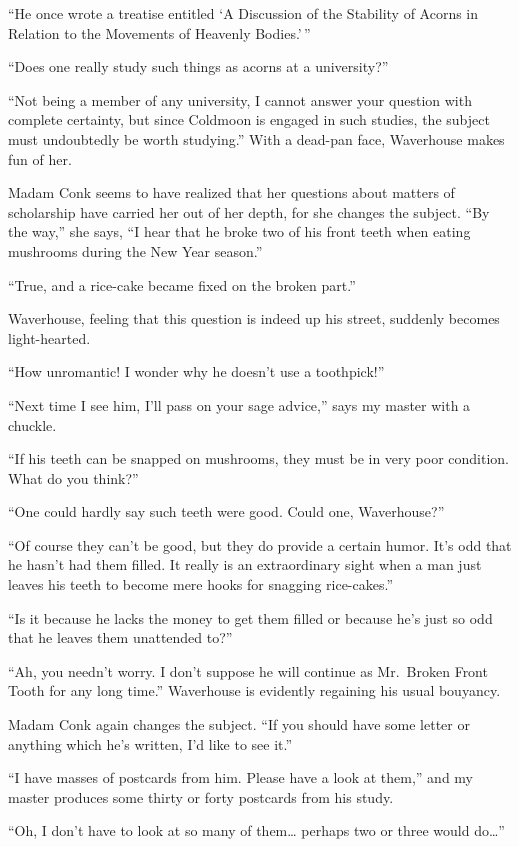 \documentclass[12pt, openright]{book}
\begin{document}
``He once wrote a treatise entitled `A Discussion of the Stability of
Acorns in Relation to the Movements of Heavenly Bodies.'\,''

``Does one really study such things as acorns at a university?''

``Not being a member of any university, I cannot answer your question
with complete certainty, but since Coldmoon is engaged in such studies,
the subject must undoubtedly be worth studying.'' With a dead-pan face,
Waverhouse makes fun of her.

Madam Conk seems to have realized that her questions about matters of
scholarship have carried her out of her depth, for she changes the
subject. ``By the way,'' she says, ``I hear that he broke two of his
front teeth when eating mushrooms during the New Year season.''

``True, and a rice-cake became fixed on the broken part.''

Waverhouse, feeling that this question is indeed up his street, suddenly
becomes light-hearted.

``How unromantic! I wonder why he doesn't use a toothpick!''

``Next time I see him, I'll pass on your sage advice,'' says my master
with a chuckle.

``If his teeth can be snapped on mushrooms, they must be in very poor
condition. What do you think?''

``One could hardly say such teeth were good. Could one, Waverhouse?''

``Of course they can't be good, but they do provide a certain humor.
It's odd that he hasn't had them filled. It really is an extraordinary
sight when a man just leaves his teeth to become mere hooks for snagging
rice-cakes.''

``Is it because he lacks the money to get them filled or because he's
just so odd that he leaves them unattended to?''

``Ah, you needn't worry. I don't suppose he will continue as Mr.~Broken
Front Tooth for any long time.'' Waverhouse is evidently regaining his
usual bouyancy.

Madam Conk again changes the subject. ``If you should have some letter
or anything which he's written, I'd like to see it.''

``I have masses of postcards from him. Please have a look at them,'' and
my master produces some thirty or forty postcards from his study.

``Oh, I don't have to look at so many of them\ldots{} perhaps two or
three would do\ldots{}''
\end{document}
